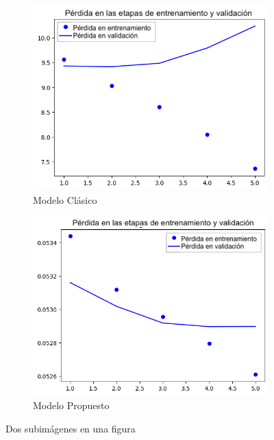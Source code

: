 \documentclass[runningheads]{llncs}
\begin{document}
\begin{figure}[h!]
	\centering
	\begin{subfigure}[b]{0.45\textwidth}
		\centering
		\includegraphics[width=\textwidth]{assets/clasica.png}
		\caption{Modelo Clásico}
		\label{fig:sub1}
	\end{subfigure}
	\hfill
	\begin{subfigure}[b]{0.45\textwidth}
		\centering
		\includegraphics[width=\textwidth]{assets/propuesta.png}
		\caption{Modelo Propuesto}
		\label{fig:sub2}
	\end{subfigure}
	\caption{Dos subimágenes en una figura}
	\label{fig:imagen_completa}
\end{figure}
\end{document}
